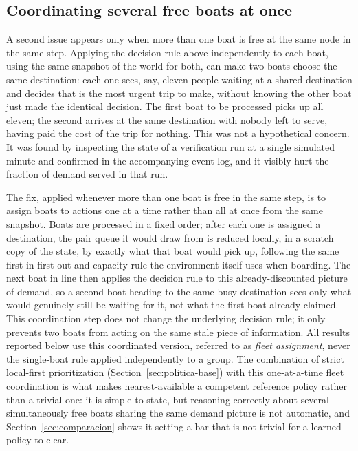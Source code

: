 \documentclass[11pt,a4paper]{article}
\begin{document}
\subsection{Coordinating several free boats at once}
\label{sec:asignar-flota}

A second issue appears only when more than one boat is free at the same node in the same step. Applying the decision rule above independently to each boat, using the same snapshot of the world for both, can make two boats choose the same destination: each one sees, say, eleven people waiting at a shared destination and decides that is the most urgent trip to make, without knowing the other boat just made the identical decision. The first boat to be processed picks up all eleven; the second arrives at the same destination with nobody left to serve, having paid the cost of the trip for nothing. This was not a hypothetical concern. It was found by inspecting the state of a verification run at a single simulated minute and confirmed in the accompanying event log, and it visibly hurt the fraction of demand served in that run.

The fix, applied whenever more than one boat is free in the same step, is to assign boats to actions one at a time rather than all at once from the same snapshot. Boats are processed in a fixed order; after each one is assigned a destination, the pair queue it would draw from is reduced locally, in a scratch copy of the state, by exactly what that boat would pick up, following the same first-in-first-out and capacity rule the environment itself uses when boarding. The next boat in line then applies the decision rule to this already-discounted picture of demand, so a second boat heading to the same busy destination sees only what would genuinely still be waiting for it, not what the first boat already claimed. This coordination step does not change the underlying decision rule; it only prevents two boats from acting on the same stale piece of information. All results reported below use this coordinated version, referred to as \emph{fleet assignment}, never the single-boat rule applied independently to a group. The combination of strict local-first prioritization (Section~\ref{sec:politica-base}) with this one-at-a-time fleet coordination is what makes nearest-available a competent reference policy rather than a trivial one: it is simple to state, but reasoning correctly about several simultaneously free boats sharing the same demand picture is not automatic, and Section~\ref{sec:comparacion} shows it setting a bar that is not trivial for a learned policy to clear.
\end{document}
